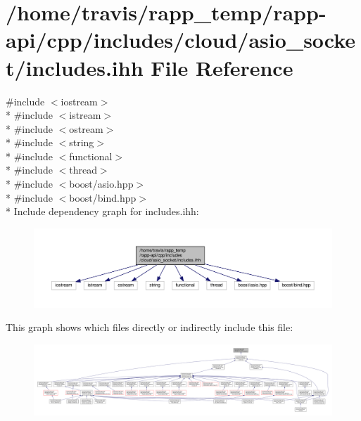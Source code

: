 \hypertarget{cloud_2asio__socket_2includes_8ihh}{\section{/home/travis/rapp\-\_\-temp/rapp-\/api/cpp/includes/cloud/asio\-\_\-socket/includes.ihh File Reference}
\label{cloud_2asio__socket_2includes_8ihh}
}
{\ttfamily \#include $<$iostream$>$}\\*
{\ttfamily \#include $<$istream$>$}\\*
{\ttfamily \#include $<$ostream$>$}\\*
{\ttfamily \#include $<$string$>$}\\*
{\ttfamily \#include $<$functional$>$}\\*
{\ttfamily \#include $<$thread$>$}\\*
{\ttfamily \#include $<$boost/asio.\-hpp$>$}\\*
{\ttfamily \#include $<$boost/bind.\-hpp$>$}\\*
Include dependency graph for includes.\-ihh\-:
\nopagebreak
\begin{figure}[H]
\begin{center}
\leavevmode
\includegraphics[width=350pt]{cloud_2asio__socket_2includes_8ihh__incl}
\end{center}
\end{figure}
This graph shows which files directly or indirectly include this file\-:
\nopagebreak
\begin{figure}[H]
\begin{center}
\leavevmode
\includegraphics[width=350pt]{cloud_2asio__socket_2includes_8ihh__dep__incl}
\end{center}
\end{figure}
